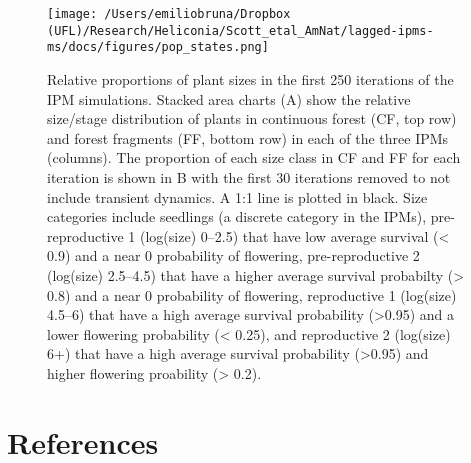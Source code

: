 \documentclass[
]{article}
\begin{document}
\begin{figure}
\centering
\texttt{[image: /Users/emiliobruna/Dropbox (UFL)/Research/Heliconia/Scott\_etal\_AmNat/lagged-ipms-ms/docs/figures/pop\_states.png]}
\caption{\label{fig:pop-states}Relative proportions of plant sizes in the first 250 iterations of the IPM simulations. Stacked area charts (A) show the relative size/stage distribution of plants in continuous forest (CF, top row) and forest fragments (FF, bottom row) in each of the three IPMs (columns). The proportion of each size class in CF and FF for each iteration is shown in B with the first 30 iterations removed to not include transient dynamics. A 1:1 line is plotted in black. Size categories include seedlings (a discrete category in the IPMs), pre-reproductive 1 (log(size) 0--2.5) that have low average survival (\textless{} 0.9) and a near 0 probability of flowering, pre-reproductive 2 (log(size) 2.5--4.5) that have a higher average survival probabilty (\textgreater{} 0.8) and a near 0 probability of flowering, reproductive 1 (log(size) 4.5--6) that have a high average survival probability (\textgreater0.95) and a lower flowering probability (\textless{} 0.25), and reproductive 2 (log(size) 6+) that have a high average survival probability (\textgreater0.95) and higher flowering proability (\textgreater{} 0.2).}
\end{figure}

\hypertarget{references}{%
\section{References}\label{references}}
\end{document}
